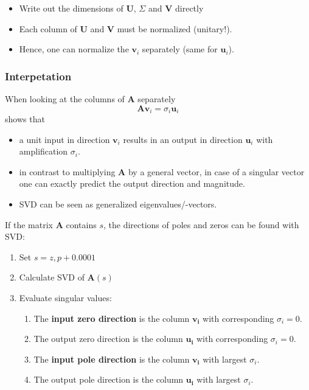 
\begin{itemize}
    \item Write out the dimensions of $\mathbf{U}$, $\Sigma$ and $\mathbf{V}$ directly
    \item Each column of $\mathbf{U}$ and $\mathbf{V}$ must be normalized (unitary!).
    \item Hence, one can normalize the $\mathbf{v}_i$ separately (same for $\mathbf{u}_i$).
\end{itemize}

\subsubsection{Interpetation}
When looking at the columns of $\mathbf{A}$ separately
\noindent\begin{equation*}
    \mathbf{Av}_i=\sigma_i \mathbf{u}_i
\end{equation*}
shows that
\begin{itemize}
    \item a unit input in direction $\mathbf{v}_i$ results in an output in direction $\mathbf{u}_i$ with amplification $\sigma_i$.
    \item in contrast to multiplying $\mathbf{A}$ by a general vector, in case of a singular vector one can exactly predict the output direction and magnitude.
    \item SVD can be seen as generalized eigenvalues/-vectors.
\end{itemize}

\newpar{}

If the matrix $\mathbf{A}$ contains $s$, the directions of poles and zeros can be found with SVD:
\begin{enumerate}
    \item Set $s=z, p+0.0001$
    \item Calculate SVD of $\mathbf{A}(s)$
    \item Evaluate singular values:
          \begin{enumerate}
              \item The \textbf{input zero direction} is the column $\mathbf{v_i}$ with corresponding $\sigma_i=0$.
              \item The output zero direction is the column $\mathbf{u_i}$ with corresponding $\sigma_i=0$.
              \item The \textbf{input pole direction} is the column $\mathbf{v_i}$ with largest $\sigma_i$.
              \item The output pole direction is the column $\mathbf{u_i}$ with largest $\sigma_i$.
          \end{enumerate}
\end{enumerate}

